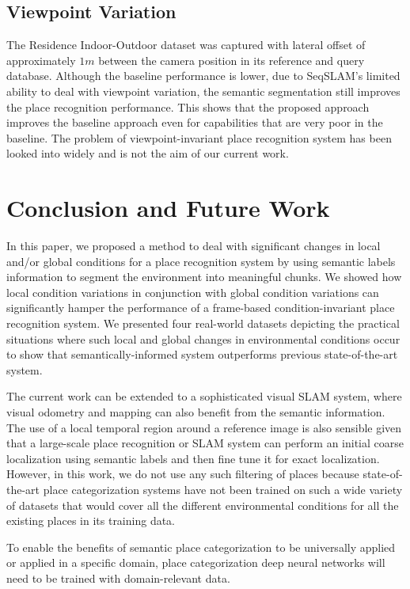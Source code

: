 \documentclass[letterpaper, 10 pt, conference]{ieeeconf}  %
\begin{document}
\subsection{Viewpoint Variation}
The Residence Indoor-Outdoor dataset was captured with lateral offset of approximately $1 m$ between the camera position in its reference and query database. Although the baseline performance is lower, due to SeqSLAM's limited ability to deal with viewpoint variation, the semantic segmentation still improves the place recognition performance. This shows that the proposed approach improves the baseline approach even for capabilities that are very poor in the baseline. The problem of viewpoint-invariant place recognition system has been looked into widely \cite{milford2015sequence,chen2017deep,sunderhauf2015place} and is not the aim of our current work.

\section{Conclusion and Future Work}
In this paper, we proposed a method to deal with significant changes in local and/or global conditions for a place recognition system by using semantic labels information to segment the environment into meaningful chunks. We showed how local condition variations in conjunction with global condition variations can significantly hamper the performance of a frame-based condition-invariant place recognition system. We presented four real-world datasets depicting the practical situations where such local and global changes in environmental conditions occur to show that semantically-informed system outperforms previous state-of-the-art system.

The current work can be extended to a sophisticated visual SLAM system, where visual odometry and mapping can also benefit from the semantic information. The use of a local temporal region around a reference image is also sensible given that a large-scale place recognition or SLAM system can perform an initial coarse localization using semantic labels and then fine tune it for exact localization. However, in this work, we do not use any such filtering of places because state-of-the-art place categorization systems have not been trained on such a wide variety of datasets that would cover all the different environmental conditions for all the existing places in its training data.

To enable the benefits of semantic place categorization to be universally applied or applied in a specific domain, place categorization deep neural networks will need to be trained with domain-relevant data.
\end{document}

